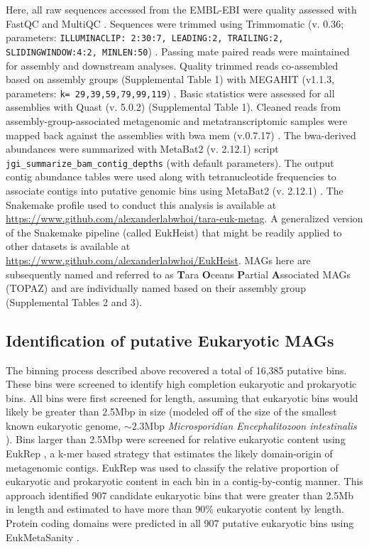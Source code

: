 \documentclass[12pt]{article}
\numberwithin{equation}{section}
\begin{document}
Here, all raw sequences accessed from the EMBL-EBI were quality assessed with FastQC and MultiQC \citep{Andrews2010FastQC}. Sequences were trimmed using Trimmomatic (v. 0.36; parameters: \texttt{ILLUMINACLIP: 2:30:7, LEADING:2, TRAILING:2, SLIDINGWINDOW:4:2, MINLEN:50}) \citep{Bolger2014Trimmomatic}. Passing mate paired reads were maintained for assembly and downstream analyses. Quality trimmed reads co-assembled based on assembly groups (Supplemental Table 1) with MEGAHIT (v1.1.3, parameters: \texttt{k= 29,39,59,79,99,119}) \citep{Li2015MEGAHIT}. Basic statistics were assessed for all assemblies with Quast (v. 5.0.2) \citep{Gurevich_2013} (Supplemental Table 1). Cleaned reads from assembly-group-associated metagenomic and metatranscriptomic samples were mapped back against the assemblies with bwa mem (v.0.7.17) \citep{Li2010Fast}. The bwa-derived abundances were summarized with MetaBat2 (v. 2.12.1) script \texttt{jgi\_summarize\_bam\_contig\_depths} (with default parameters). The output contig abundance tables were used along with tetranucleotide frequencies to associate contigs into putative genomic bins using MetaBat2 (v. 2.12.1) \citep{Kang_2019}. The Snakemake profile used to conduct this analysis is available at \url{https://www.github.com/alexanderlabwhoi/tara-euk-metag}. A generalized version of the Snakemake pipeline (called EukHeist) that might be readily applied to other datasets is available at \url{https://www.github.com/alexanderlabwhoi/EukHeist}. MAGs here are subsequently named and referred to as \textbf{T}ara \textbf{O}ceans \textbf{P}artial \textbf{A}ssociated MAGs (TOPAZ) and are individually named based on their assembly group (Supplemental Tables 2 and 3).

\subsection*{Identification of putative Eukaryotic MAGs} The binning process described above recovered a total of 16,385 putative bins. These bins were screened to identify high completion eukaryotic and prokaryotic bins. All bins were first screened for length, assuming that eukaryotic bins would likely be greater than 2.5Mbp in size (modeled off of the size of the smallest known eukaryotic genome, $\sim 2.3$Mbp \textit{Microsporidian Encephalitozoon intestinalis} \citep{Corradi2010complete}). Bins larger than 2.5Mbp were screened for relative eukaryotic content using EukRep \citep{West2018Genome-reconstruction}, a k-mer based strategy that estimates the likely domain-origin of metagenomic contigs. EukRep was used to classify the relative proportion of eukaryotic and prokaryotic content in each bin in a contig-by-contig manner. This approach identified 907 candidate eukaryotic bins that were greater than 2.5Mb in length and estimated to have more than 90\% eukaryotic content by length. Protein coding domains were predicted in all 907 putative eukaryotic bins using EukMetaSanity \citep{EukMS}. 
\end{document}
